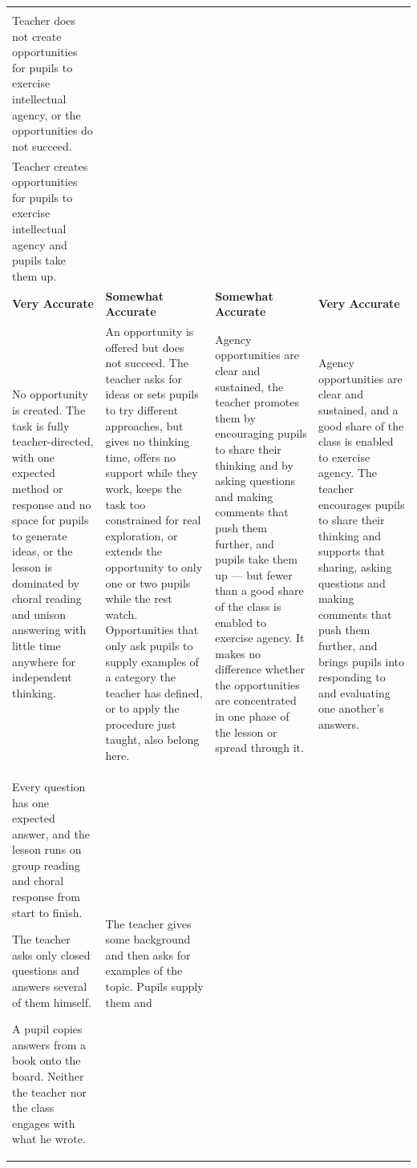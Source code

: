 \documentclass[10pt,a4paper]{article}
\makeatletter
\newcommand{\exlistsize}{\scriptsize}
\renewcommand{\arraystretch}{1.25}
\newlength{\gridw}\newlength{\stemw}\newlength{\stemh}\newlength{\stemtop}
\newcommand{\stemrow}[2]{%
  \setlength{\stemtop}{1.15\ht\strutbox}%
  \setlength{\stemw}{0.5\dimexpr\gridw-2\arrayrulewidth\relax}%
  \sbox{\stemAbox}{\begin{minipage}[t]{\dimexpr\stemw-4.4mm\relax}\RaggedRight
      \footnotesize\textbf{Column A}\\#1\end{minipage}}%
  \sbox{\stemBbox}{\begin{minipage}[t]{\dimexpr\stemw-4.4mm\relax}\RaggedRight
      \footnotesize\textbf{Column B}\\#2\end{minipage}}%
  \setlength{\stemh}{\dimexpr\ht\stemAbox+\dp\stemAbox\relax}%
  \ifdim\dimexpr\ht\stemBbox+\dp\stemBbox\relax>\stemh
    \setlength{\stemh}{\dimexpr\ht\stemBbox+\dp\stemBbox\relax}\fi
  \setlength{\stemh}{\dimexpr\stemtop+\stemh+2.6mm\relax}%
  \begin{tikzpicture}[inner sep=0pt,outer sep=0pt,baseline=0pt]
    \shade[left color=gradA,middle color=gradM,right color=gradB]
      (0,\stemtop) rectangle (\dimexpr\gridw-2\arrayrulewidth\relax,
                              \dimexpr\stemtop-\stemh\relax);
    \draw[black,line width=\arrayrulewidth]
      (\stemw,\stemtop) -- (\stemw,\dimexpr\stemtop-\stemh\relax);
    \node[anchor=north west] at (2.2mm,\dimexpr\stemtop-1.2mm\relax)
      {\usebox{\stemAbox}};
    \node[anchor=north west] at (\dimexpr\stemw+2.2mm\relax,
                                 \dimexpr\stemtop-1.2mm\relax)
      {\usebox{\stemBbox}};
  \end{tikzpicture}}
\newcommand{\scoregrid}[4]{%
  \setlength{\gridw}{\linewidth}%
  \renewcommand{\arraystretch}{1.06}%
  \noindent\footnotesize
  \begin{tabularx}{\linewidth}{|>{\RaggedRight\arraybackslash}X
                               |>{\RaggedRight\arraybackslash}X
                               |>{\RaggedRight\arraybackslash}X
                               |>{\RaggedRight\arraybackslash}X|}
  \hline
  \multicolumn{4}{|@{}l@{}|}{\stemrow{#1}{#2}}\\
  \hline
  \rowcolor{tsub}
  \centering\arraybackslash\textbf{Very Accurate} &
  \centering\arraybackslash\textbf{Somewhat Accurate} &
  \centering\arraybackslash\textbf{Somewhat Accurate} &
  \centering\arraybackslash\textbf{Very Accurate}\\
  \hline
  #3\\
  \hline
  \rowcolor{texfill} #4\\
  \hline
  \end{tabularx}\normalsize}
\makeatother
\begin{document}
\scoregrid{Teacher does not create opportunities for pupils to exercise intellectual agency, or the
opportunities do not succeed.}%
          {Teacher creates opportunities for pupils to exercise intellectual agency and pupils take them
up.}{%
\footnotesize No opportunity is created. The task is fully teacher-directed, with one expected method or
response and no space for pupils to generate ideas, or the lesson is dominated by choral reading and unison
answering with little time anywhere for independent thinking. &
\footnotesize An opportunity is offered but does not succeed. The teacher asks for ideas or sets pupils to
try different approaches, but gives no thinking time, offers no support while they work, keeps the task too
constrained for real exploration, or extends the opportunity to only one or two pupils while the rest watch.
Opportunities that only ask pupils to supply examples of a category the teacher has defined, or to apply the
procedure just taught, also belong here. &
\footnotesize Agency opportunities are clear and sustained, the teacher promotes them by encouraging pupils
to share their thinking and by asking questions and making comments that push them further, and pupils take
them up --- but fewer than a good share of the class is enabled to exercise agency. It makes no difference
whether the opportunities are concentrated in one phase of the lesson or spread through it. &
\footnotesize Agency opportunities are clear and sustained, and a good share of the class is enabled to
exercise agency. The teacher encourages pupils to share their thinking and supports that sharing, asking
questions and making comments that push them further, and brings pupils into responding to and evaluating
one another's answers.
}{%
\exlistsize\begin{exlist}
  \item Every question has one expected answer, and the lesson runs on group reading and choral response
        from start to finish.
  \item The teacher asks only closed questions and answers several of them himself.
  \item A pupil copies answers from a book onto the board. Neither the teacher nor the class engages with
        what he wrote.
\end{exlist} &
\exlistsize\begin{exlist}
  \item The teacher gives some background and then asks for examples of the topic. Pupils supply them and

\end{exlist}}
\end{document}
